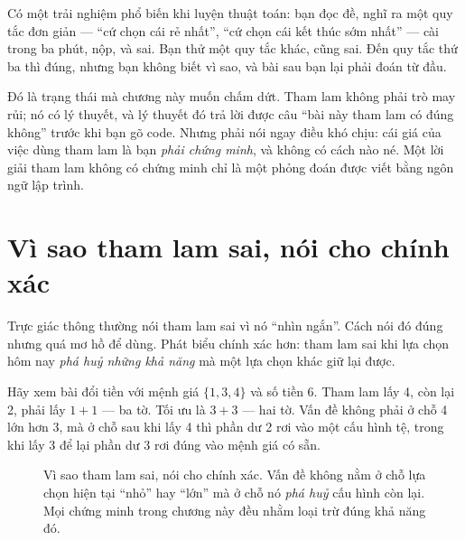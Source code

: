 \documentclass[../../algorithm.tex]{subfiles}
\begin{document}
Có một trải nghiệm phổ biến khi luyện thuật toán: bạn đọc đề, nghĩ ra một quy tắc đơn giản --- ``cứ chọn cái rẻ nhất'', ``cứ chọn cái kết thúc sớm nhất'' --- cài trong ba phút, nộp, và sai. Bạn thử một quy tắc khác, cũng sai. Đến quy tắc thứ ba thì đúng, nhưng bạn không biết vì sao, và bài sau bạn lại phải đoán từ đầu.

Đó là trạng thái mà chương này muốn chấm dứt. Tham lam không phải trò may rủi; nó có lý thuyết, và lý thuyết đó trả lời được câu ``bài này tham lam có đúng không'' trước khi bạn gõ code. Nhưng phải nói ngay điều khó chịu: cái giá của việc dùng tham lam là bạn \emph{phải chứng minh}, và không có cách nào né. Một lời giải tham lam không có chứng minh chỉ là một phỏng đoán được viết bằng ngôn ngữ lập trình.

\section{Vì sao tham lam sai, nói cho chính xác}

Trực giác thông thường nói tham lam sai vì nó ``nhìn ngắn''. Cách nói đó đúng nhưng quá mơ hồ để dùng. Phát biểu chính xác hơn: tham lam sai khi lựa chọn hôm nay \emph{phá huỷ những khả năng} mà một lựa chọn khác giữ lại được.

Hãy xem bài đổi tiền với mệnh giá \(\{1,3,4\}\) và số tiền 6. Tham lam lấy 4, còn lại 2, phải lấy \(1+1\) --- ba tờ. Tối ưu là \(3+3\) --- hai tờ. Vấn đề không phải ở chỗ 4 lớn hơn 3, mà ở chỗ sau khi lấy 4 thì phần dư 2 rơi vào một cấu hình tệ, trong khi lấy 3 để lại phần dư 3 rơi đúng vào mệnh giá có sẵn.

\begin{figure}[H]\centering
{}
\caption{Vì sao tham lam sai, nói cho chính xác. Vấn đề không nằm ở chỗ lựa chọn hiện tại ``nhỏ'' hay ``lớn'' mà ở chỗ nó \emph{phá huỷ} cấu hình còn lại. Mọi chứng minh trong chương này đều nhằm loại trừ đúng khả năng đó.}
\label{fig:greedy-fail}
\end{figure}
\end{document}
